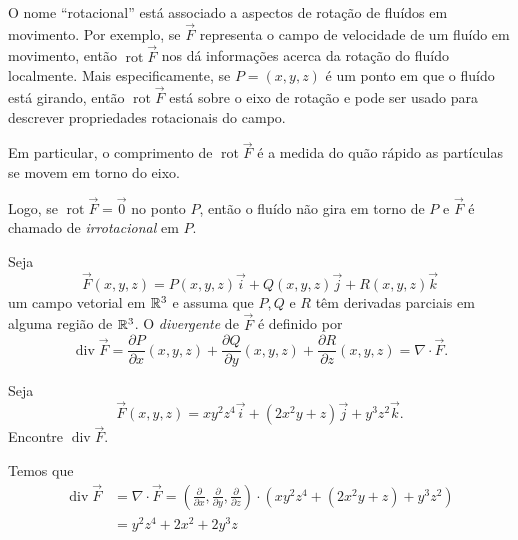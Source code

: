 O nome ``rotacional'' está associado a aspectos de rotação de fluídos em movimento. Por exemplo, se \(\overrightarrow{F}\) representa o campo de velocidade de um fluído em movimento, então \(\operatorname{rot}\overrightarrow{F}\) nos dá informações acerca da rotação do fluído localmente. Mais especificamente, se \(P = (x,y,z)\) é um ponto em que o fluído está girando, então \(\operatorname{rot}\overrightarrow{F}\) está sobre o eixo de rotação e pode ser usado para descrever propriedades rotacionais do campo.

Em particular, o comprimento de \(\operatorname{rot}\overrightarrow{F}\) é a medida do quão rápido as partículas se movem em torno do eixo.

Logo, se \(\operatorname{rot}\overrightarrow{F} = \overrightarrow{0}\) no ponto \(P\), então o fluído não gira em torno de \(P\) e \(\overrightarrow{F}\) é chamado de \textit{irrotacional} em \(P\).

\begin{definition}
    Seja \[\overrightarrow{F}(x,y,z) = P(x,y,z)\overrightarrow{i} + Q(x,y,z)\overrightarrow{j} + R(x,y,z)\overrightarrow{k}\] um campo vetorial em \(\mathbb{R}^3\) e assuma que \(P,Q\) e \(R\) têm derivadas parciais em alguma região de \(\mathbb{R}^3\). O \textit{divergente} de \(\overrightarrow{F}\) é definido por \[\operatorname{div} \overrightarrow{F} = \frac{\partial P}{\partial x}(x,y,z) + \frac{\partial Q}{\partial y}(x,y,z) + \frac{\partial R}{\partial z}(x,y,z) = \nabla\cdot\overrightarrow{F}.\]
\end{definition}

\begin{example}
    Seja \[\overrightarrow{F}(x,y,z) = xy^2z^4\overrightarrow{i} + (2x^2y + z)\overrightarrow{j} + y^3z^2\overrightarrow{k}.\] Encontre \(\operatorname{div}\overrightarrow{F}.\)

    Temos que
        \begin{align*}
            \operatorname{div} \overrightarrow{F}
                & = \nabla\cdot\overrightarrow{F} = \left( \frac{\partial}{\partial x}, \frac{\partial}{\partial y}, \frac{\partial}{\partial z} \right)\cdot\left( xy^2z^4 + (2x^2y + z) + y^3z^2 \right) \\
                & = y^2z^4 + 2x^2 + 2y^3z
        \end{align*}
\end{example}

